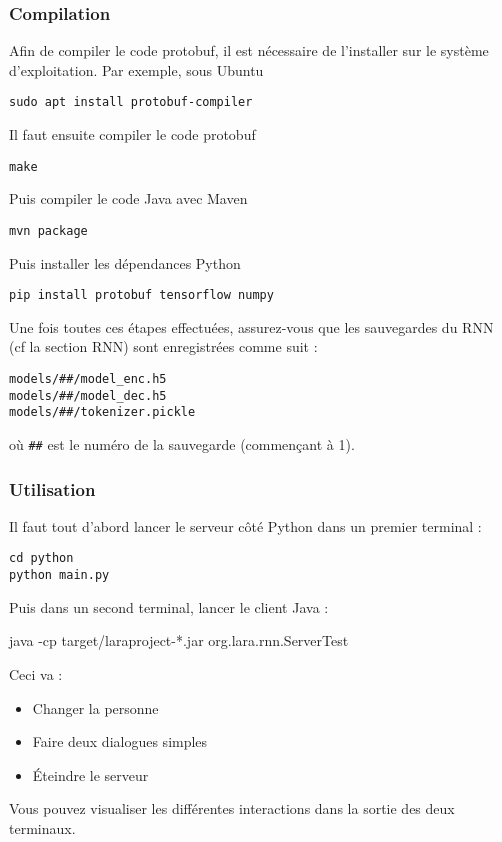 \documentclass[10pt,a4paper]{article}
\begin{document}
\subsubsection{Compilation}
Afin de compiler le code protobuf, il est nécessaire de l'installer sur le système d'exploitation. Par exemple, sous Ubuntu
\begin{center}
\texttt{sudo apt install protobuf-compiler}
\end{center}
Il faut ensuite compiler le code protobuf
\begin{center}
\texttt{make}
\end{center}
Puis compiler le code Java avec Maven
\begin{center}
\texttt{mvn package}
\end{center}
Puis installer les dépendances Python
\begin{center}
\texttt{pip install protobuf tensorflow numpy}
\end{center}
Une fois toutes ces étapes effectuées, assurez-vous que les sauvegardes du RNN (cf la section RNN) sont enregistrées comme suit :
\begin{center}
\texttt{models/\#\#/model\_enc.h5} \\
\texttt{models/\#\#/model\_dec.h5} \\
\texttt{models/\#\#/tokenizer.pickle}
\end{center}
où \texttt{\#\#} est le numéro de la sauvegarde (commençant à 1).
\subsubsection{Utilisation}
Il faut tout d'abord lancer le serveur côté Python dans un premier terminal :
\begin{center}
\texttt{cd python} \\
\texttt{python main.py}
\end{center}
Puis dans un second terminal, lancer le client Java :
\begin{center}
java -cp target/laraproject-*.jar org.lara.rnn.ServerTest
\end{center}
Ceci va :
\begin{itemize}
\item Changer la personne
\item Faire deux dialogues simples
\item Éteindre le serveur
\end{itemize}
Vous pouvez visualiser les différentes interactions dans la sortie des deux terminaux.
 
\end{document}
